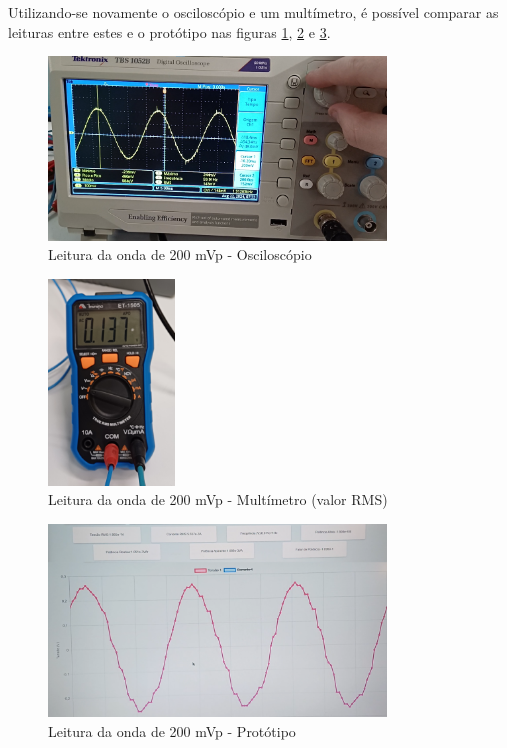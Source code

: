 Utilizando-se novamente o osciloscópio e um multímetro, é possível comparar as leituras entre estes e o protótipo nas figuras \ref{fig:leitura-200-osc}, \ref{fig:leitura-200-mult} e \ref{fig:leitura-200-boy-onda}.

\begin{figure}[htb!]
    \caption{Leitura da onda de 200 mVp - Osciloscópio}
    \label{fig:leitura-200-osc}
    \includegraphics[width=0.8\textwidth]{figuras/leitura-200-osc.png}
    \fonte{}
\end{figure}

\begin{figure}[htb!]
    \caption{Leitura da onda de 200 mVp - Multímetro (valor RMS)}
    \label{fig:leitura-200-mult}
    \includegraphics[width=0.3\textwidth]{figuras/leitura-200-mult.png}
    \fonte{}
\end{figure}

\begin{figure}[htb!]
    \caption{Leitura da onda de 200 mVp - Protótipo}
    \label{fig:leitura-200-boy-onda}
    \includegraphics[width=0.8\textwidth]{figuras/leitura-200-boy-onda.png}
    \fonte{}
\end{figure}

